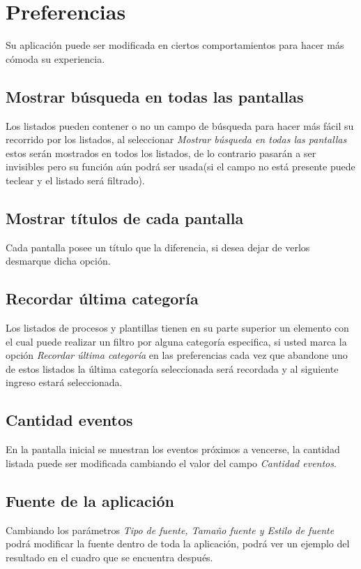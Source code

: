 \chapter{Preferencias}
\label{sec:preferencias}
Su aplicaci\'on puede ser modificada en ciertos comportamientos para hacer
m\'as c\'omoda su experiencia.


\section{Mostrar b\'usqueda en todas las pantallas}
\label{sec:busquedaPantallas}
Los listados pueden contener o no un campo de b\'usqueda para hacer m\'as
f\'acil su recorrido por los listados, al seleccionar \emph{Mostrar
b\'usqueda en todas las pantallas} estos ser\'an mostrados en todos los
listados, de lo contrario pasar\'an a ser invisibles pero su funci\'on a\'un
podr\'a ser usada(si el campo no est\'a presente puede teclear y el listado
ser\'a filtrado).
\section{Mostrar t\'itulos de cada pantalla}
\label{sec:tituloPantallas}
Cada pantalla posee un t\'itulo que la diferencia, si desea dejar de verlos
desmarque dicha opci\'on.
\section{Recordar \'ultima categor\'ia}
\label{sec:ultimaCategoria}
Los listados de procesos y plantillas tienen en su parte superior un elemento
con el cual puede realizar un filtro por alguna categor\'ia especifica, si
usted marca la opci\'on \emph{Recordar \'ultima categor\'ia} en las
preferencias cada vez que abandone uno de estos listados la \'ultima
categor\'ia seleccionada ser\'a recordada y al siguiente ingreso estar\'a seleccionada.
\section{Cantidad eventos}
\label{sec:actuacionesCriticas}
En la pantalla inicial se muestran los eventos pr\'oximos a vencerse, la
cantidad listada puede ser modificada cambiando el valor del campo
\emph{Cantidad eventos}.
\section{Fuente de la aplicaci\'on}
\label{sec:fuente}
Cambiando los par\'ametros \emph{Tipo de fuente, Tama\~no fuente y Estilo de
fuente} podr\'a modificar la fuente dentro de toda la aplicaci\'on, podr\'a ver
un ejemplo del resultado en el cuadro que se encuentra despu\'es.

